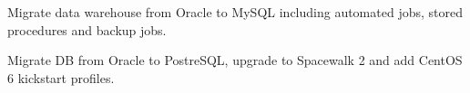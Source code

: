 \documentclass[letterpaper]{deedy-resume} %
\begin{document}
\begin{minipage}[t]{0.66\textwidth}
Migrate data warehouse from Oracle to MySQL including automated jobs, stored procedures and backup jobs.
\sectionspace %

Migrate DB from Oracle to PostreSQL, upgrade to Spacewalk 2 and add CentOS 6 kickstart profiles.
\sectionspace %



\end{minipage} %



\end{document}

